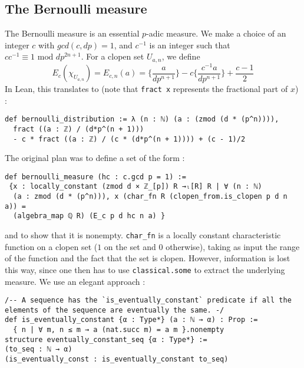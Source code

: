 \documentclass[a4paper,UKenglish,cleveref, autoref, thm-restate]{lipics-v2021}
\newcommand{\lean}[1]{\texttt{#1}\xspace} %
\begin{document}
\subsection{The Bernoulli measure}
The Bernoulli measure is an essential $p$-adic measure. We make a choice of an integer $c$ with
$gcd(c,dp) = 1$, and $c^{-1}$ is an integer such that $c c^{-1} \equiv 1 \text{ mod } dp^{2n+1}$.
For a clopen set $U_{a,n}$, we define
$$ E_c (\chi_{U_{a,n}}) = E_{c,n} (a) = \bigg\{ \frac{a}{dp^{n + 1}} \bigg\} - c \bigg\{ \frac{c^{-1}a}{dp^{n + 1}} \bigg\} + \frac{c - 1}{2} $$
In Lean, this translates to (note that \lean{fract x} represents the fractional part of $x$) :
\begin{lstlisting}
def bernoulli_distribution := λ (n : ℕ) (a : (zmod (d * (p^n)))), 
  fract ((a : ℤ) / (d*p^(n + 1))) 
  - c * fract ((a : ℤ) / (c * (d*p^(n + 1)))) + (c - 1)/2
\end{lstlisting}
The original plan was to define a set of the form : 
\begin{lstlisting}
def bernoulli_measure (hc : c.gcd p = 1) :=
 {x : locally_constant (zmod d × ℤ_[p]) R →ₗ[R] R | ∀ (n : ℕ) 
  (a : zmod (d * (p^n))), x (char_fn R (clopen_from.is_clopen p d n a)) = 
  (algebra_map ℚ R) (E_c p d hc n a) }
\end{lstlisting}
and to show that it is nonempty. \lean{char\_fn} is a locally constant characteristic function on a clopen set ($1$ on the set and $0$ otherwise), 
taking as input the range of the function and the fact that the set is clopen. However, information is lost this way, since one then has to use 
\lean{classical.some} to extract the underlying measure. We use an elegant approach :
\begin{lstlisting}
/-- A sequence has the `is_eventually_constant` predicate if all the elements of the sequence are eventually the same. -/
def is_eventually_constant {α : Type*} (a : ℕ → α) : Prop := 
  { n | ∀ m, n ≤ m → a (nat.succ m) = a m }.nonempty
structure eventually_constant_seq {α : Type*} :=
(to_seq : ℕ → α) 
(is_eventually_const : is_eventually_constant to_seq)
\end{lstlisting}
\end{document}
